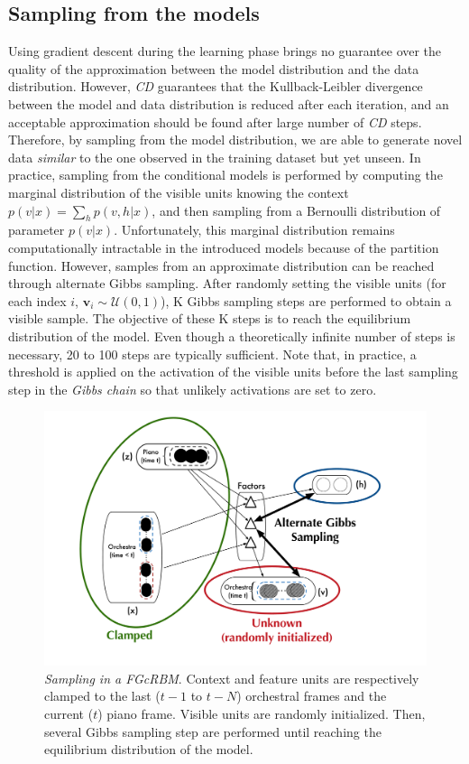 \documentclass{article}
\begin{document}
\subsection{Sampling from the models}
Using gradient descent during the learning phase brings no guarantee over the quality of the approximation between the model distribution and the data distribution.
However, \textit{CD} guarantees that the Kullback-Leibler divergence between the model and data distribution is reduced after each iteration\cite{hinton2002training}, and an acceptable approximation should be found after large number of \textit{CD} steps.
Therefore, by sampling from the model distribution, we are able to generate novel data \textit{similar} to the one observed in the training dataset but yet unseen. In practice, sampling from the conditional models is performed by computing the marginal distribution of the visible units knowing the context $p(v|x) = \sum_{h} p(v,h|x)$, and then sampling from a Bernoulli distribution of parameter $p(v|x)$.
Unfortunately, this marginal distribution remains computationally intractable in the introduced models because of the partition function. However, samples from an approximate distribution can be reached through alternate Gibbs sampling. After randomly setting the visible units (for each index $i$, $\bm{v}_{i} \sim \mathcal{U}(0,1)$), K Gibbs sampling steps are performed to obtain a visible sample. The objective of these K steps is to reach the equilibrium distribution of the model. Even though a theoretically  infinite number of steps is necessary, 20 to 100 steps are typically sufficient.
Note that, in practice, a threshold is applied on the activation of the visible units before the last sampling step in the \textit{Gibbs chain} so that unlikely activations are set to zero.

\begin{figure}
\centering
\includegraphics[scale=0.14]{FGcRBM_sampling}
\caption{\textit{Sampling in a FGcRBM}. Context and feature units are respectively clamped to the last ($t-1$ to $t-N$) orchestral frames and the current ($t$) piano frame. Visible units are randomly initialized. Then, several Gibbs sampling step are performed until reaching the equilibrium distribution of the model.}
\label{fig:FGcRBM_sampling}
\end{figure}
\end{document}
